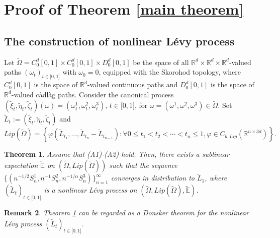 \documentclass[a4paper,oneside,10pt]{article}%
\newtheorem{theorem}{Theorem}[section]
\newtheorem{remark}[theorem]{Remark}
\numberwithin{equation}{section}
\begin{document}
\section{Proof of Theorem \ref{main theorem}}

\subsection{The construction of nonlinear L\'{e}vy process}

\label{Section_The construction of Levy process}

Let $\tilde{\Omega}=C_{0}^{d}[0,1]\times C_{0}^{d}[0,1]\times D_{0}^{d}[0,1]$
be the space of all $\mathbb{R}^{d}\times \mathbb{R}^{d}\times \mathbb{R}^{d}%
$-valued paths $(\omega_{t})_{t\in \lbrack0,1]}$ with $\omega_{0}=0$, equipped
with the Skorohod topology, where $C_{0}^{d}[0,1]$ is the space of
$\mathbb{R}^{d}$-valued continuous paths and $D_{0}^{d}[0,1]$ is the space of
$\mathbb{R}^{d}$-valued c\`{a}dl\`{a}g paths. Consider the canonical process
$(\tilde{\xi}_{t},\tilde{\eta}_{t},\tilde{\zeta}_{t})(\omega)=(\omega_{t}
^{1},\omega_{t}^{2},\omega_{t}^{3})$, $t\in \lbrack0,1]$, for $\omega
=(\omega^{1},\omega^{2},\omega^{3})\in \tilde{\Omega}$. Set $\tilde{L}%
_{t}:=(\tilde{\xi}_{t},\tilde{\eta}_{t},\tilde{\zeta}_{t})$ and
\[
Lip(\tilde{\Omega})=\left \{  \varphi(\tilde{L}_{t_{1}},\ldots,\tilde{L}
_{t_{n}}-\tilde{L} _{t_{n-1}}):\forall0\leq t_{1}<t_{2}<\cdots<t_{n}
\leq1,\varphi \in C_{b,Lip}(\mathbb{R}^{n\times3d})\right \}  .
\]


\begin{theorem}
\label{The construction of Levy process}Assume that (A1)-(A2) hold. Then,
there exists a sublinear expectation $\mathbb{\tilde{E}}$ on $(\tilde{\Omega
},Lip(\tilde{\Omega}))$ such that the sequence $\{(n^{-1/2}S_{n}^{1}%
,n^{-1}S_{n}^{2},n^{-1/\alpha}S_{n}^{3})\}_{n=1}^{\infty}$ converges in
distribution to $\tilde{L}_{1}$, where $(\tilde{L}_{t})_{t\in \lbrack0,1]}$ is
a nonlinear L\'evy process on $(\tilde{\Omega},Lip(\tilde{\Omega}),
\mathbb{\tilde{E}})$.
\end{theorem}

\begin{remark}
Theorem \ref{The construction of Levy process} can be regarded as a Donsker
theorem for the nonlinear L\'evy process $(\tilde{L}_{t})_{t\in \lbrack0,1]}$.
\end{remark}
\end{document}
